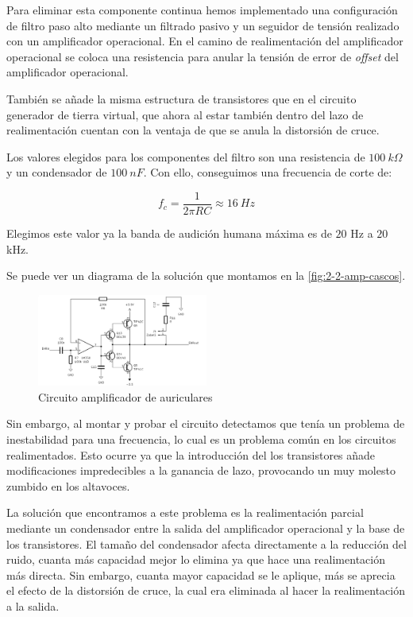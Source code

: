 Para eliminar esta componente continua hemos implementado una configuración de filtro paso alto mediante un filtrado pasivo y un seguidor de tensión realizado con un amplificador operacional. En el camino de realimentación del amplificador operacional se coloca una resistencia para anular la tensión de error de \textit{offset} del amplificador operacional.

También se añade la misma estructura de transistores que en el circuito generador de tierra virtual, que ahora al estar también dentro del lazo de realimentación cuentan con la ventaja de que se anula la distorsión de cruce. 

Los valores elegidos para los componentes del filtro son una resistencia de $100\ k\Omega$ y un condensador de $100\ nF$. Con ello, conseguimos una frecuencia de corte de:

\[
    f_c = \frac{1}{2\pi RC} \approx 16\ Hz    
\]

Elegimos este valor ya la banda de audición humana máxima es de $20$ Hz a $20$ kHz.

Se puede ver un diagrama de la solución que montamos en la \autoref{fig:2-2-amp-cascos}.

\begin{figure}[h]
    \centering
    \includegraphics[width=0.5\textwidth]{images/2/2-2/circuitoAmplificadorCascos.png}
    \caption{Circuito amplificador de auriculares}
    \label{fig:2-2-amp-cascos}
\end{figure}

Sin embargo, al montar y probar el circuito detectamos que tenía un problema de inestabilidad para una frecuencia, lo cual es un problema común en los circuitos realimentados. Esto ocurre ya que la introducción del los transistores añade modificaciones impredecibles a la ganancia de lazo, provocando un muy molesto zumbido en los altavoces.

La solución que encontramos a este problema es la realimentación parcial mediante un condensador entre la salida del amplificador operacional y la base de los transistores. El tamaño del condensador afecta directamente a la reducción del ruido, cuanta más capacidad mejor lo elimina ya que hace una realimentación más directa. Sin embargo, cuanta mayor capacidad se le aplique, más se aprecia el efecto de la distorsión de cruce, la cual era eliminada al hacer la realimentación a la salida.

